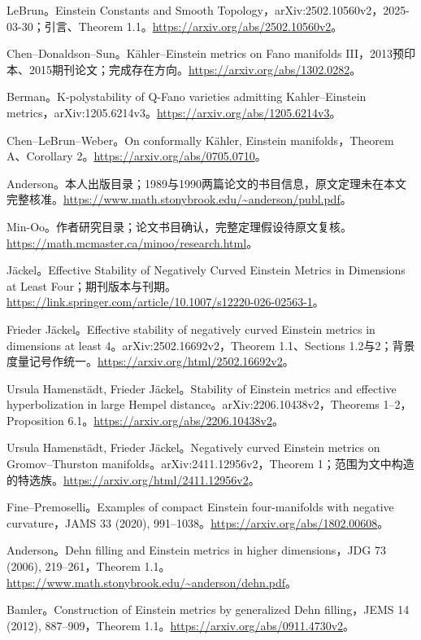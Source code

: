 \documentclass[11pt,a4paper]{article}
\theoremstyle{definition}
\begin{document}
\begin{enumerate}[label={[\arabic*]},leftmargin=2.2em,itemsep=0.55em]
\item LeBrun。Einstein Constants and Smooth Topology，arXiv:2502.10560v2，2025-03-30；引言、Theorem 1.1。\url{https://arxiv.org/abs/2502.10560v2}。
\item Chen--Donaldson--Sun。Kähler--Einstein metrics on Fano manifolds III，2013预印本、2015期刊论文；完成存在方向。\url{https://arxiv.org/abs/1302.0282}。
\item Berman。K-polystability of Q-Fano varieties admitting Kahler--Einstein metrics，arXiv:1205.6214v3。\url{https://arxiv.org/abs/1205.6214v3}。
\item Chen--LeBrun--Weber。On conformally Kähler, Einstein manifolds，Theorem A、Corollary 2。\url{https://arxiv.org/abs/0705.0710}。
\item Anderson。本人出版目录；1989与1990两篇论文的书目信息，原文定理未在本文完整核准。\url{https://www.math.stonybrook.edu/~anderson/publ.pdf}。
\item Min-Oo。作者研究目录；论文书目确认，完整定理假设待原文复核。\url{https://math.mcmaster.ca/minoo/research.html}。
\item Jäckel。Effective Stability of Negatively Curved Einstein Metrics in Dimensions at Least Four；期刊版本与刊期。\url{https://link.springer.com/article/10.1007/s12220-026-02563-1}。
\item Frieder Jäckel。Effective stability of negatively curved Einstein metrics in dimensions at least 4。arXiv:2502.16692v2，Theorem 1.1、Sections 1.2与2；背景度量记号作统一。\url{https://arxiv.org/html/2502.16692v2}。
\item Ursula Hamenstädt, Frieder Jäckel。Stability of Einstein metrics and effective hyperbolization in large Hempel distance。arXiv:2206.10438v2，Theorems 1--2，Proposition 6.1。\url{https://arxiv.org/abs/2206.10438v2}。
\item Ursula Hamenstädt, Frieder Jäckel。Negatively curved Einstein metrics on Gromov--Thurston manifolds。arXiv:2411.12956v2，Theorem 1；范围为文中构造的特选族。\url{https://arxiv.org/html/2411.12956v2}。
\item Fine--Premoselli。Examples of compact Einstein four-manifolds with negative curvature，JAMS 33 (2020), 991--1038。\url{https://arxiv.org/abs/1802.00608}。
\item Anderson。Dehn filling and Einstein metrics in higher dimensions，JDG 73 (2006), 219--261，Theorem 1.1。\url{https://www.math.stonybrook.edu/~anderson/dehn.pdf}。
\item Bamler。Construction of Einstein metrics by generalized Dehn filling，JEMS 14 (2012), 887--909，Theorem 1.1。\url{https://arxiv.org/abs/0911.4730v2}。

\end{enumerate}
\end{document}
